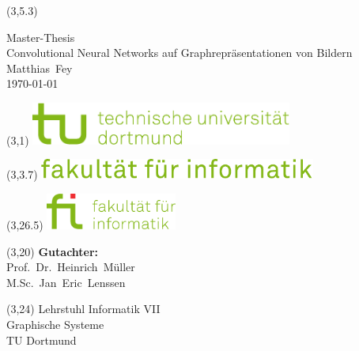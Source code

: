 \begin{titlepage}


\setlength{\TPHorizModule}{1cm}
\setlength{\TPVertModule}{1cm}
\setlength{\parindent}{0cm}

\sffamily

\vspace*{2cm}

\begin{textblock}{9} (3,5.3)
  \Large
  \begin{minipage}[c][9cm]{9cm}
    \begin{center}
      {\Huge Master-Thesis}\\
      \vspace*{1cm}
      {\huge Convolutional Neural Networks auf Graphrepräsentationen von Bildern}\\
      \vspace*{1cm}
      Matthias~Fey\\
      \today
    \end{center}
  \end{minipage}
  \normalsize
\end{textblock}

\begin{textblock}{9} (3,1)
  \includegraphics[height=1.4cm]{images/tud_logo}
\end{textblock}

\begin{textblock}{15} (3,3.7)
  \includegraphics[height=0.65cm]{images/fi_text}
\end{textblock}

\begin{textblock}{9} (3,26.5)
  \includegraphics[height=1.2cm]{images/fi_logo}
\end{textblock}

\begin{textblock}{9} (3,20)
  \Large
  \textbf{Gutachter:}\\
  Prof.~Dr.~Heinrich~Müller\\
  M.Sc.~Jan~Eric~Lenssen
  \normalsize
\end{textblock}

\begin{textblock}{9} (3,24)
  \large
  \textcolor{TUGreen}{
    Lehrstuhl Informatik VII\\
    Graphische Systeme\\
    TU Dortmund
  }
  \normalsize
\end{textblock}

\end{titlepage}
